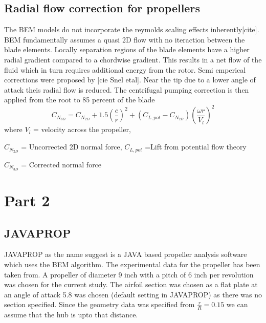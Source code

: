 \documentclass[main.tex]{subfiles}
\begin{document}
\subsection{Radial flow correction for propellers}
The BEM models do not incorporate the reymolds scaling effects inherently[cite]. BEM fundamentally assumes a quasi 2D flow with no iteraction between the blade elements. Locally separation regions of the blade elements have a higher radial gradient compared to a chordwise gradient. This results in a net flow of the fluid which in turn requires additional energy from the rotor. Semi emperical corrections were proposed by [cie Snel etal]. Near the tip due to a lower angle of attack theis radial flow is reduced. The centrifugal pumping correction is then applied from the root to 85 percent of the blade
$$
C_{N_{3D}} = C_{N_{2D}} + 1.5(\frac{c}{r})^2 + (C_{L,pot} - C_{N_{2D}})(\frac{\omega r}{V_{l}})^2
$$
where
$V_{l}$ = velocity across the propeller,

$C_{N_{2D}}$ = Uncorrected 2D normal force,
$C_{L,pot}$ =Lift from potential flow theory

$C_{N_{3D}}$ = Corrected normal force 


\section{Part 2}
\subsection{JAVAPROP}
JAVAPROP as the name suggest is a JAVA based propeller analysis software which uses the BEM algorithm. The experimental data for the propeller has been taken from\cite{UIUC}. A propeller of diameter 9 inch with a pitch of 6 inch per revolution was chosen for the current study. The airfoil section was chosen as a flat plate at an angle of attack 5.8 was chosen (default setting in JAVAPROP) as there was no section specified. Since the geometry data was specified from $\frac{r}{R} = 0.15$ we can assume that the hub is upto that distance.
 
\end{document}
